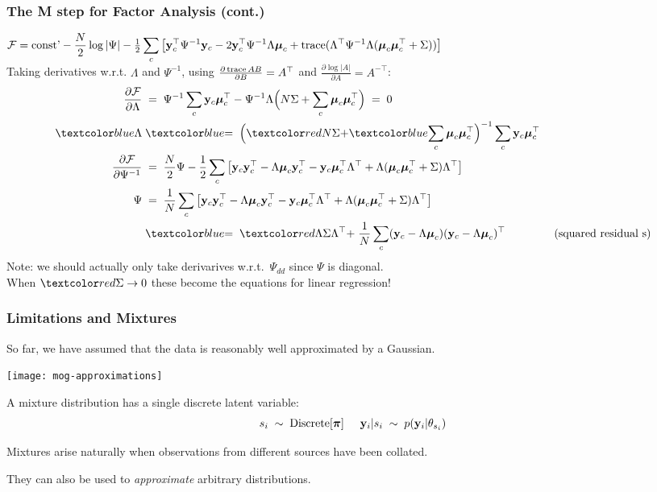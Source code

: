 \begin{frame}
\frametitle{The M step for Factor Analysis (cont.)}

$\displaystyle{\cal F}=\mbox{const'}-\frac{N}{2} \log |\Psi| -
\tfrac{1}{2} \sum_c \left[ \mathbf y_c^\top \Psi^{-1} \mathbf y_c - 2 \mathbf y_c^\top \Psi^{-1}
  \Lambda {\boldsymbol{\mu}}_c  + \operatorname{trace}(\Lambda^\top \Psi^{-1} \Lambda ({\boldsymbol{\mu}}_c
  {\boldsymbol{\mu}}_c^\top + \Sigma))\right] $ \\
Taking derivatives w.r.t. $\Lambda$ and $\Psi^{-1}$, using
$\tfrac{\partial\operatorname{trace}{AB}}{\partial B}=A^\top$ and
$\tfrac{\partial\log|A|}{\partial A}=A^{-\top}$:
%
\[
\begin{split}
\frac{\partial{\cal F}}{\partial\Lambda}\;&=\;
\Psi^{-1}\sum_c\bfy_c\bmu_c^\top -
\Psi^{-1} \Lambda \Big(N \Sigma + \sum_c \bmu_c \bmu_c^\top \Big)\;=\;0 \\
\Blue{\Lambda}\;&\Blue{=\;\Big(}\Red{N\Sigma+}
\Blue{\sum_c \bmu_c \bmu_c^\top \Big)^{-1}\sum_c \bfy_c \bmu_c^\top}\\
\frac{\partial{\cal F}}{\partial\Psi^{-1}}\;&=\;\frac{N}{2}\Psi
-\frac{1}{2}\sum_c\left[ \bfy_c \bfy_c^\top - \Lambda \bmu_c \bfy_c^\top - \bfy
_c \bmu_c^\top \Lambda^\top + \Lambda (\bmu_c
 \bmu_c^\top + \Sigma ) \Lambda^\top\right] \\
\Psi\;&=\;\frac{1}{N} \sum_c \left[ \bfy_c \bfy_c^\top - \Lambda \bmu_c
  \bfy_c^\top - \bfy_c \bmu_c^\top \Lambda^\top + \Lambda (\bmu_c \bmu_c^\top
 + \Sigma ) \Lambda^\top\right] \\
&\Blue{=\;\Red{\Lambda \Sigma \Lambda^\top +}\;\frac{1}{N} \sum_c
(\bfy_c - \Lambda
\bmu_c) (\bfy_c - \Lambda \bmu_c)^\top} \hspace{0.6in} \mbox{(squared residual
s)}
\end{split}
\]
%
Note: we should actually only take derivarives w.r.t.\ $\Psi_{dd}$ since
$\Psi$ is diagonal. \\[-0.3ex] When $\Red{\Sigma \rightarrow 0}$ these become
the equations for linear regression!
\end{frame}

\begin{frame}
\frametitle{Limitations and Mixtures}

So far, we have assumed that the data is reasonably well approximated by a
Gaussian.

\centerline{\texttt{[image: mog-approximations]}}

A mixture distribution has a single discrete latent variable:
\[
s_i\;\sim\;{\rm Discrete}[\boldsymbol\pi] \hspace{5mm}
\mathbf y_i | s_i\;\sim\;p(\mathbf y_i|\theta_{s_i})
\]

Mixtures arise naturally when observations from different sources have
been collated.

They can also be used to \emph{approximate} arbitrary distributions.
\end{frame}

